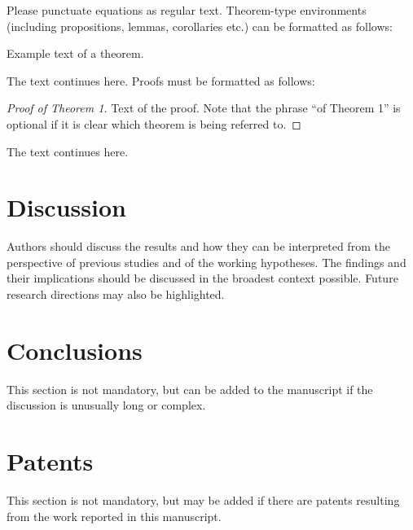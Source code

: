\begin{paracol}{2}
\linenumbers
\switchcolumn

Please punctuate equations as regular text. Theorem-type environments (including propositions, lemmas, corollaries etc.) can be formatted as follows:
\begin{Theorem}
Example text of a theorem.
\end{Theorem}

The text continues here. Proofs must be formatted as follows:

\begin{proof}[Proof of Theorem 1]
Text of the proof. Note that the phrase ``of Theorem 1'' is optional if it is clear which theorem is being referred to.
\end{proof}
The text continues here.

\section{Discussion}

Authors should discuss the results and how they can be interpreted from the perspective of previous studies and of the working hypotheses. The findings and their implications should be discussed in the broadest context possible. Future research directions may also be highlighted.

\section{Conclusions}

This section is not mandatory, but can be added to the manuscript if the discussion is unusually long or complex.

\section{Patents}

This section is not mandatory, but may be added if there are patents resulting from the work reported in this manuscript.

\end{paracol}
